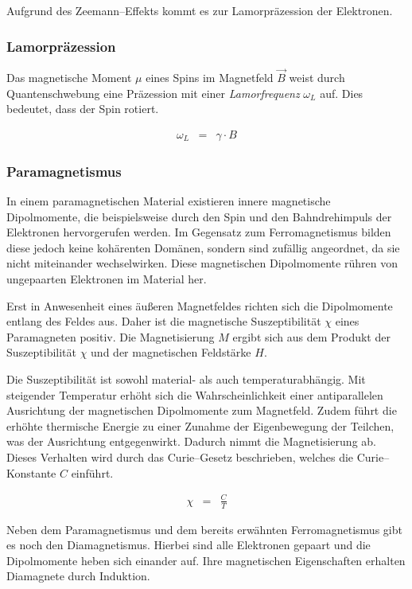 \documentclass[12pt,a4paper]{scrartcl}
\numberwithin{equation}{section} %
\begin{document}
Aufgrund des Zeemann--Effekts kommt es zur Lamorpräzession der Elektronen.

\hypertarget{lamorpruxe4zession}{%
	\subsubsection{Lamorpräzession}\label{lamorpruxe4zession}}

Das magnetische Moment $\mu$ eines Spins im Magnetfeld $\vec{B}$ weist durch Quantenschwebung eine Präzession mit einer \emph{Lamorfrequenz} $\omega_L$ auf. Dies bedeutet, dass der Spin rotiert.

\begin{eqnarray}
	\omega_L &=& \gamma\cdot B
\end{eqnarray}

\subsubsection{Paramagnetismus}
\label{Paramagnetismus}

In einem paramagnetischen Material existieren innere magnetische Dipolmomente, die beispielsweise durch den Spin und den Bahndrehimpuls der Elektronen hervorgerufen werden. Im Gegensatz zum Ferromagnetismus bilden diese jedoch keine kohärenten Domänen, sondern sind zufällig angeordnet, da sie nicht miteinander wechselwirken. Diese magnetischen Dipolmomente rühren von ungepaarten Elektronen im Material her.

Erst in Anwesenheit eines äußeren Magnetfeldes richten sich die Dipolmomente entlang des Feldes aus. Daher ist die magnetische Suszeptibilität $\chi$ eines Paramagneten positiv. Die Magnetisierung $M$ ergibt sich aus dem Produkt der Suszeptibilität $\chi$ und der magnetischen Feldstärke $H$.

Die Suszeptibilität ist sowohl material- als auch temperaturabhängig. Mit steigender Temperatur erhöht sich die Wahrscheinlichkeit einer antiparallelen Ausrichtung der magnetischen Dipolmomente zum Magnetfeld. Zudem führt die erhöhte thermische Energie zu einer Zunahme der Eigenbewegung der Teilchen, was der Ausrichtung entgegenwirkt. Dadurch nimmt die Magnetisierung ab. Dieses Verhalten wird durch das Curie--Gesetz beschrieben, welches die Curie--Konstante $C$ einführt.

\begin{eqnarray}
	\chi &=& \frac{C}{T}
\end{eqnarray}

\noindent
Neben dem Paramagnetismus und dem bereits erwähnten Ferromagnetismus gibt es noch den Diamagnetismus. Hierbei sind alle Elektronen gepaart und die Dipolmomente heben sich einander auf. Ihre magnetischen Eigenschaften erhalten Diamagnete durch Induktion.
\end{document}
